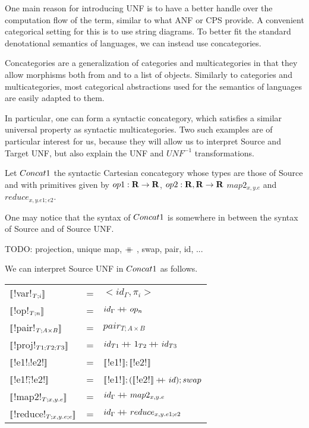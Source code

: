 One main reason for introducing UNF is to have a better handle over
the computation flow of the term, similar to what ANF or CPS provide. 
A convenient categorical setting for this is to use string diagrams.
To better fit the standard denotational semantics of languages, 
we can instead use concategories. 

Concategories are a generalization of categories and multicategories in that 
they allow morphisms both from and to a list of objects. 
Similarly to categories and multicategories, 
most categorical abstractions used for the semantics of languages are easily adapted to them.

In particular, one can form a syntactic concategory, 
which satisfies a similar universal property as syntactic multicategories.
Two such examples are of particular interest for us, 
because they will allow us to interpret Source and Target UNF, 
but also explain the UNF and $UNF^{-1}$ transformations.

\begin{definition}[$\ConcatS$]
Let $\ConcatS$ the syntactic Cartesian concategory whose types are those of Source and 
with primitives given by $op1: \mathbf{R} \to \mathbf{R}$, $op2: \mathbf{R},\mathbf{R} \to \mathbf{R}$ $map2_{x,y.e}$
and $reduce_{x,y.e1;e2}$.
\end{definition}

One may notice that the syntax of $\ConcatS$ is somewhere in between the syntax of Source and of Source UNF.

\begin{notation}
    TODO: projection, unique map, $+\kern-1.3ex+\kern0.8ex$, swap, pair, id, ...
\end{notation}

We can interpret Source UNF in $\ConcatS$ as follows.

\begin{tabular}{l c l}
   $\llbracket$!var!$_{T;i} \rrbracket$ &=& $<id_\Gamma,\pi_i>$ \\
   $\llbracket$!op!$_{T;n} \rrbracket$ &=& $id_\Gamma+\kern-1.3ex+\kern0.8ex op_n$\\
   $\llbracket$!pair!$_{T;A\times B} \rrbracket$ &=& $pair_{T;A\times B}$ \\
   $\llbracket$!proj!$_{T1;T2;T3} \rrbracket$ &=& $id_{T1}+\kern-1.3ex+\kern0.8ex 1_{T2}+\kern-1.3ex+\kern0.8ex id_{T3}$\\
   $\llbracket$!e1!$\comp$!e2!$\rrbracket$  &=& $\llbracket$!e1!$\rrbracket ; \llbracket$!e2!$\rrbracket$ \\
   $\llbracket$!e1!$\widetilde{;}$!e2!$\rrbracket$ &=& $\llbracket$!e1!$\rrbracket ; (\llbracket$!e2!$\rrbracket+\kern-1.3ex+\kern0.8ex id ); swap$ \\
   $\llbracket$!map2!$_{T;x,y.e}\rrbracket$  &=& $id_\Gamma+\kern-1.3ex+\kern0.8ex map2_{x,y.e}$ \\
   $\llbracket$!reduce!$_{T;x,y.e;e}\rrbracket$ &=& $id_\Gamma+\kern-1.3ex+\kern0.8ex reduce_{x,y.e1;e2}$ \\
\end{tabular}

